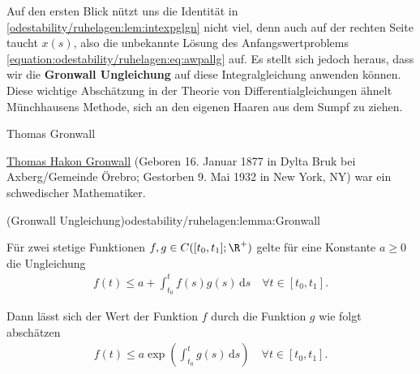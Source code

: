 \documentclass[letterpaper,10pt,english]{jupyterBook}
\begin{document}
\par
Auf den ersten Blick nützt uns die Identität in \cref{odestability/ruhelagen:lem:intexpglgn} nicht viel, denn auch auf der rechten Seite taucht \(x(s)\), also die unbekannte Lösung des Anfangswertproblems \eqref{equation:odestability/ruhelagen:eq:awpallg} auf.
Es stellt sich jedoch heraus, dass wir die \textbf{Gronwall Ungleichung} auf diese Integralgleichung anwenden können.
Diese wichtige Abschätzung in der Theorie von Differentialgleichungen ähnelt Münchhausens Methode, sich an den eigenen Haaren aus dem Sumpf zu ziehen.

\begin{emphBox}{Thomas Gronwall}{}

\par
\href{https://de.wikipedia.org/wiki/Thomas\_Hakon\_Gr\%C3\%B6nwall}{Thomas Hakon Gronwall} (Geboren 16. Januar 1877 in Dylta Bruk bei Axberg/Gemeinde Örebro; Gestorben 9. Mai 1932 in New York, NY) war ein schwedischer Mathematiker.
\end{emphBox}
\begin{lemma}{(Gronwall Ungleichung)}{odestability/ruhelagen:lemma:Gronwall}



\par
Für zwei stetige Funktionen \(f,g\in C([t_0,t_1]; \R^+)\) gelte für eine Konstante \(a \geq 0\) die Ungleichung
\begin{align*}
f(t) \leq a + \int_{t_0}^t f(s)g(s)\, \mathrm{d}s \quad \forall t\in [t_0,t_1].
\end{align*}
\par
Dann lässt sich der Wert der Funktion \(f\) durch die Funktion \(g\) wie folgt abschätzen
\begin{align*}
f(t) \leq a \exp{ \left(\int_{t_0}^t g(s)\, \mathrm{d}s \right)} \quad \forall t\in [t_0,t_1].
\end{align*}\end{lemma}
\end{document}
